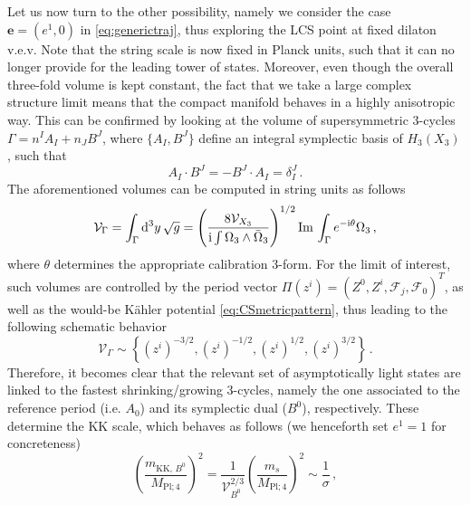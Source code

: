 Let us now turn to the other possibility, namely we consider the case $\mathbf{e}=(e^1, 0)$ in \eqref{eq:generictraj}, thus exploring the LCS point at fixed dilaton v.e.v. %
Note that the string scale is now fixed in Planck units, such that it can no longer provide for the leading tower of states. Moreover, even though the overall three-fold volume is kept constant, the fact that we take a large complex structure limit means that the compact manifold behaves in a highly anisotropic way. This can be confirmed by looking at the volume of supersymmetric 3-cycles $\Gamma=n^I A_I + n_J B^J$, where $\{A_I, B^J \}$ define an integral symplectic basis of $H_3(X_3)$, such that
%
\begin{equation}\label{eq:symplecticpairing}
	A_I \cdot B^J = - B^J \cdot A_I= \delta^J_I\, .
\end{equation}
%
The aforementioned volumes can be computed in string units as follows \cite{Lee:2019wij}
%
\begin{equation}\label{eq:slagvolumes}
	\mathcal{V}_{\Gamma} = \int_{\Gamma} {\rm d}^3 y\, \sqrt{g} = \left(\frac{8 \mathcal{V}_{X_3}}{{\rm i} \int\Omega_3 \wedge \bar \Omega_3 } \right)^{1/2} \text{Im}\, \int_{\Gamma} e^{-{\rm i} \theta}\Omega_3 \, ,
\end{equation}
%
where $\theta$ determines the appropriate calibration 3-form. For the limit of interest, such volumes are controlled by the period vector $\Pi(z^i) = \left(Z^0, Z^i, \mathcal{F}_j, \mathcal{F}_0\right)^{T}$, as well as the would-be K\"ahler potential \eqref{eq:CSmetricpattern}, thus leading to the following schematic behavior
%
\begin{equation}
	\mathcal{V}_{\Gamma} \sim \left \lbrace (z^i)^{-3/2}, (z^i)^{-1/2}, (z^i)^{1/2}, (z^i)^{3/2} \right\rbrace\, .
\end{equation}
%
Therefore, it becomes clear that the relevant set of asymptotically light states are linked to the fastest shrinking/growing 3-cycles, namely the one associated to the reference period (i.e. $A_0$) and its symplectic dual ($B^0$), respectively. These determine the KK scale, which behaves as follows (we henceforth set $e^1=1$ for concreteness)
%
\begin{equation}\label{eq:KKSYZ}
	\left(\frac{m_{\text{KK},\, B^0}}{M_{\text{Pl;}\, 4}} \right)^2= \frac{1}{\mathcal{V}_{B^0}^{2/3}} \left(\frac{m_s}{M_{\text{Pl;}\, 4}} \right)^2 \sim \frac{1}{\sigma}\, ,
\end{equation}

